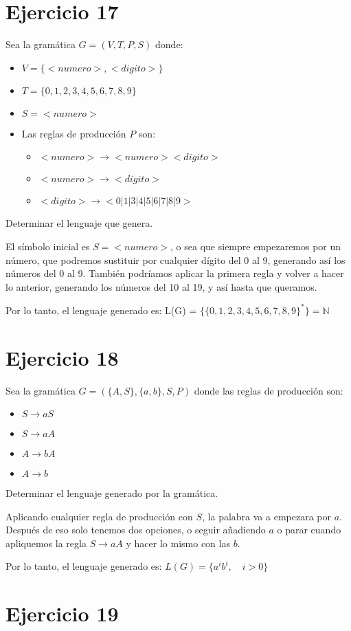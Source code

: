 \documentclass[a4paper, 11pt]{article}
\begin{document}
\section*{Ejercicio 17}
Sea la gramática $G=(V,T,P,S)$ donde:
\begin{itemize}
\item $V=\{<numero>, <digito>\}$
\item $T = \{0,1,2,3,4,5,6,7,8,9\}$
\item $S=<numero>$
\item Las reglas de producción $P$ son:
\begin{itemize}
\item $<numero> \longrightarrow <numero><digito>$
\item $<numero> \longrightarrow <digito>$
\item $<digito> \longrightarrow <0|1|3|4|5|6|7|8|9>$
\end{itemize}
\end{itemize}
Determinar el lenguaje que genera.

El símbolo inicial es $S=<numero>$, o sea que siempre empezaremos por un número, que podremos sustituir por cualquier dígito del 0 al 9, generando así los números del 0 al 9. También podríamos aplicar la primera regla y volver a hacer lo anterior, generando los números del 10 al 19, y así hasta que queramos.

Por lo tanto, el lenguaje generado es: L(G) = $\{\{0,1,2,3,4,5,6,7,8,9\}^*\}=\mathbb{N}$
\section*{Ejercicio 18}
Sea la gramática $G=(\{A,S\},\{a,b\},S,P)$ donde las reglas de producción son:
\begin{itemize}
\item $S \longrightarrow aS$
\item $S \longrightarrow aA$
\item $A \longrightarrow bA$
\item $A \longrightarrow b$
\end{itemize}
Determinar el lenguaje generado por la gramática.

Aplicando cualquier regla de producción con $S$, la palabra va a empezara por $a$. Después de eso solo tenemos dos opciones, o seguir añadiendo $a$ o parar cuando apliquemos la regla $S\longrightarrow aA$ y hacer lo mismo con las $b$.

Por lo tanto, el lenguaje generado es: $L(G) = \{a^ib^i,\quad i>0\}$
\section*{Ejercicio 19}
\end{document}
